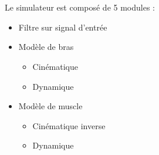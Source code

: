 \documentclass[pdftex,a4paper,11pt]{article}
\numberwithin{equation}{subsection}
\begin{document}
\begin{figure}
    \centering
    ~~~
    ~~~
\end{figure}

\paragraph{}
Le simulateur est composé de 5 modules :
\begin{itemize}
    \item Filtre sur signal d'entrée
    \item Modèle de bras
    \begin{itemize}
        \item Cinématique
        \item Dynamique
    \end{itemize}
    \item Modèle de muscle
    \begin{itemize}
        \item Cinématique inverse
        \item Dynamique
    \end{itemize}
\end{itemize}
\end{document}
